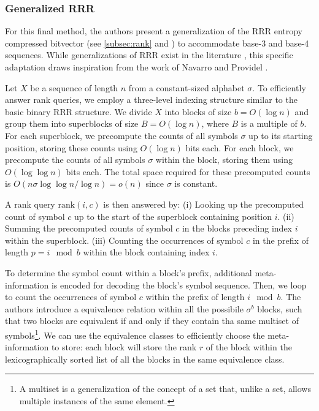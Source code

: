 \subsubsection{Generalized RRR}

For this final method, the authors present a generalization of the RRR entropy compressed bitvector (see \autoref{subsec:rank} and \cite{RRR2002}) to accommodate base-3 and base-4 sequences. While generalizations of RRR exist in the literature \cite{ferragina2007compressed}, this specific adaptation draws inspiration from the work of Navarro and Providel \cite{navarro2012fast}.

\noindent Let \(X\) be a sequence of length \(n\) from a constant-sized alphabet \(\sigma\). To efficiently answer rank queries, we employ a three-level indexing structure similar to the basic binary RRR structure. We divide \(X\) into blocks of size \(b = O(\log n)\) and group them into superblocks of size \(B = O(\log n)\), where \(B\) is a multiple of \(b\). For each superblock, we precompute the counts of all symbols \(\sigma\) up to its starting position, storing these counts using \(O(\log n)\) bits each. For each block, we precompute the counts of all symbols \(\sigma\) within the block, storing them using \(O(\log \log n)\) bits each. The total space required for these precomputed counts is \(O(n \sigma \log \log n / \log n) = o(n)\) since \(\sigma\) is constant.

\noindent A rank query \(\textrm{rank}(i, c)\) is then answered by: (i) Looking up the precomputed count of symbol \(c\) up to the start of the superblock containing position \(i\). (ii) Summing the precomputed counts of symbol \(c\) in the blocks preceding index \(i\) within the superblock. (iii) Counting the occurrences of symbol \(c\) in the prefix of length \(p = i \mod b\) within the block containing index \(i\).


\noindent To determine the symbol count within a block's prefix, additional meta-information is encoded for decoding the block's symbol sequence. Then, we loop to count the occurrences of symbol \(c\) within the prefix of length $i \mod b$. The authors introduce a equivalence relation within all the possibile $\sigma^b$ blocks, such that two blocks are equivalent if and only if they contain tha same multiset of symbols\footnote{A multiset is a generalization of the concept of a set that, unlike a set, allows multiple instances of the same element.}. We can use the equivalence classes to efficiently choose the meta-information to store: each block will store the rank $r$ of the block within the lexicographically sorted list of all the blocks in the same equivalence class.

